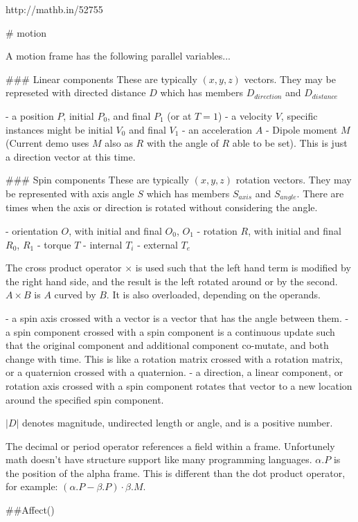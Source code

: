 
http://mathb.in/52755


# motion

A motion frame has the following parallel variables...

### Linear components
These are typically $(x,y,z)$ vectors.  They may be represeted with directed distance $D$ which has members $D_{direction}$ and $D_{distance}$

- a position $P$, initial $P_0$, and final $P_1$ (or at $T=1$)
- a velocity $V$, specific instances might be initial $V_0$ and final $V_1$
- an acceleration $A$
- Dipole moment $M$ (Current demo uses $M$ also as $R$ with the angle of $R$ able to be set).  This is just a direction vector at this time.
  
### Spin components 
These are typically $(x,y,z)$ rotation vectors.  They may be represented with axis angle $S$ which has members $S_{axis}$ and $S_{angle}$.  There are times when the axis or direction is rotated without considering the angle. 

- orientation $O$, with initial and final $O_0$, $O_1$
- rotation $R$, with initial and final $R_0$, $R_1$
- torque $T$
  - internal $T_i$
  - external $T_e$

The cross product operator $\times$ is used such that the left hand term is modified by the right hand side, and the result is the left rotated around or by the second.  $ A \times B $ is $A$ curved by $B$. It is also overloaded, depending on the operands.

- a spin axis crossed with a vector is a vector that has the angle between them.  
- a spin component crossed with a spin component is a continuous update such that the original component and additional component co-mutate, and both change with time.  This is like a rotation matrix crossed with a rotation matrix, or a quaternion crossed with a quaternion.
- a direction, a linear component, or rotation axis crossed with a spin component rotates that vector to a new location around the specified spin component.

$|D|$ denotes magnitude, undirected length or angle, and is a positive number.

The decimal or period operator references a field within a frame.  Unfortunely math doesn't have structure support like many programming languages. $\alpha.P$ is the position of the alpha frame. This is different than the dot product operator, for example: $(\alpha.P - \beta.P) \cdot \beta.M$.

##Affect()

